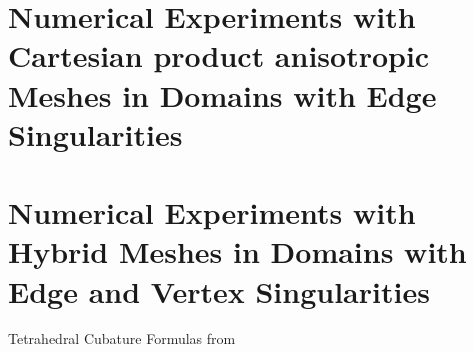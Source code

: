 \section{Numerical Experiments with Cartesian product anisotropic Meshes in Domains with Edge Singularities}

\tableErrorsUniformCylinder
\tableErrorsAnisoCylinder

\section{Numerical Experiments with Hybrid Meshes in Domains with Edge and
Vertex Singularities}



Tetrahedral Cubature Formulas from~\cite{gellertHarbord}
